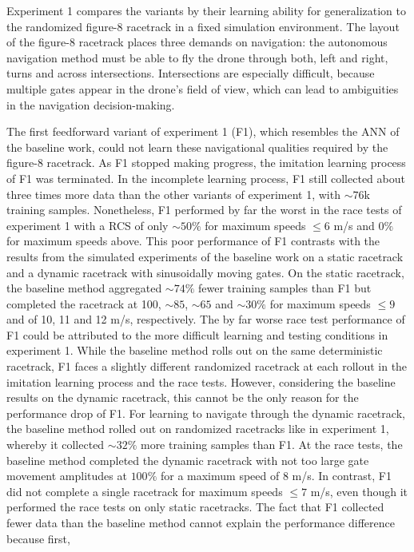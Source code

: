 Experiment 1 compares the variants by their learning ability for generalization to the randomized figure-8 racetrack 
in a fixed simulation environment. 
The layout of the figure-8 racetrack places three demands on navigation: 
the autonomous navigation method must be able to fly the drone through both, left and right, turns 
and across intersections. Intersections are especially difficult, 
because multiple gates appear in the drone's field of view, which can lead to ambiguities 
in the navigation decision-making.


The first feedforward variant of experiment 1 (F1), 
which resembles the ANN of the baseline work, 
could not learn these navigational qualities required by the figure-8 racetrack. 
As F1 stopped making progress, the imitation learning process of F1 was terminated. 
In the incomplete learning process, F1 still collected about three times more data than the other variants of experiment 1, 
with $\sim 76$k training samples. 
Nonetheless, F1 performed by far the worst in the race tests of experiment 1 
with a RCS of only $\sim 50\%$ for maximum speeds $\le 6$ m/s and $0\%$ for maximum speeds above. 
This poor performance of F1 contrasts with the results from the simulated experiments of the baseline work 
on a static racetrack and a dynamic racetrack with sinusoidally moving gates. 
On the static racetrack, the baseline method aggregated $\sim 74\%$ fewer training samples than F1 
but completed the racetrack at 100, $\sim 85$, $\sim 65$ and $\sim 30\%$ 
for maximum speeds $\le 9$ and of 10, 11 and 12 m/s, respectively. 
The by far worse race test performance of F1 could be attributed 
to the more difficult learning and testing conditions in experiment 1. 
While the baseline method rolls out on the same deterministic racetrack, 
F1 faces a slightly different randomized racetrack at each rollout in the imitation learning process and the race tests. 
However, considering the baseline results on the dynamic racetrack, 
this cannot be the only reason for the performance drop of F1. 
For learning to navigate through the dynamic racetrack, 
the baseline method rolled out on randomized racetracks like in experiment 1, 
whereby it collected $\sim 32\%$ more training samples than F1. 
At the race tests, the baseline method completed the dynamic racetrack with not too large gate movement amplitudes 
at $100\%$ for a maximum speed of 8 m/s. 
In contrast, F1 did not complete a single racetrack for maximum speeds $\le 7$ m/s, 
even though it performed the race tests on only static racetracks. 
The fact that F1 collected fewer data than the baseline method cannot explain the performance difference because first, 
